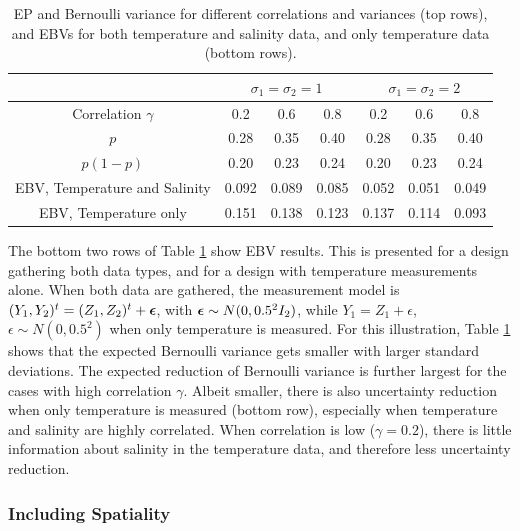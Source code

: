 \documentclass[aoas,preprint]{imsart}
\begin{document}
\begin{table}[!t] \centering \caption{EP and Bernoulli variance for
    different correlations and variances (top rows), and EBVs for both
    temperature and salinity data, and only temperature data (bottom
    rows).}
  \begin{tabular}{c|ccc|ccc}
 &\multicolumn{3}{c}{$\sigma_1=\sigma_2=1$} & \multicolumn{3}{c}{$\sigma_1=\sigma_2=2$} \\
\hline
Correlation $\gamma$ & 0.2 & 0.6 & 0.8 & 0.2 & 0.6 & 0.8 \\
\hline
$p$ & 0.28 & 0.35 & 0.40 & 0.28 & 0.35 & 0.40 \\ 
$p(1-p)$ & 0.20 & 0.23 & 0.24 & 0.20 & 0.23 & 0.24 \\ 
EBV, Temperature and Salinity & 0.092 & 0.089 & 0.085 & 0.052 & 0.051 & 0.049 \\ 
EBV, Temperature only & 0.151 & 0.138 & 0.123 & 0.137 & 0.114 & 0.093 \\ 
\hline
\end{tabular}
\label{tab:sim_rhoab}
\end{table}
The bottom two rows of Table \ref{tab:sim_rhoab} show EBV
results. This is presented for a design gathering both data types, and
for a design with temperature measurements alone. When both data are
gathered, the measurement model is
$(Y_1,Y_2)^t=(Z_1,Z_2)^t+{\boldsymbol \epsilon}$, with
${\boldsymbol \epsilon} \sim N(0,0.5^2I_2)$, while $Y_1=Z_1+\epsilon$,
$\epsilon \sim N(0,0.5^2)$ when only temperature is measured.  For
this illustration, Table \ref{tab:sim_rhoab} shows that the expected
Bernoulli variance gets smaller with larger standard deviations. The
expected reduction of Bernoulli variance is further largest for the
cases with high correlation $\gamma$. Albeit smaller, there is also
uncertainty reduction when only temperature is measured (bottom row),
especially when temperature and salinity are highly correlated. When
correlation is low ($\gamma=0.2$), there is little information about
salinity in the temperature data, and therefore less uncertainty reduction.


\subsubsection{Including Spatiality}
\label{sec:including_spatiality}
\end{document}
